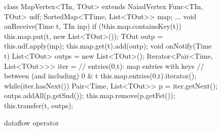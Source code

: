 \begin{figure}[t!]
\begin{numcodejava}
class MapVertex<TIn, TOut> extends NaiadVertex{
  Func<TIn, TOut> udf;
  SortedMap<TTime, List<TOut>> map;
  ...
  void onReceive(Time t, TIn inp) {
    if (!this.map.containsKey(t))
      this.map.put(t, new List<TOut>());
    TOut outp = this.udf.apply(inp);
    this.map.get(t).add(outp);
  }
  void onNotify(Time t) {
    List<TOut> outps = new List<TOut>();
    Iterator<Pair<Time, List<TOut>>> iter = 
        // entries(0,t):  map entries with keys 
        // between (and including) 0 & t
        this.map.entries(0,t).iterator();
    while(iter.hasNext()) {
      Pair<Time, List<TOut>> p = iter.getNext();
      outps.addAll(p.getSnd());
      this.map.remove(p.getFst());
    }
    this.transfer(t, outps);
  }
}
\end{numcodejava}
\caption{ dataflow operator}
\label{fig:motivating-eg}
\end{figure}
